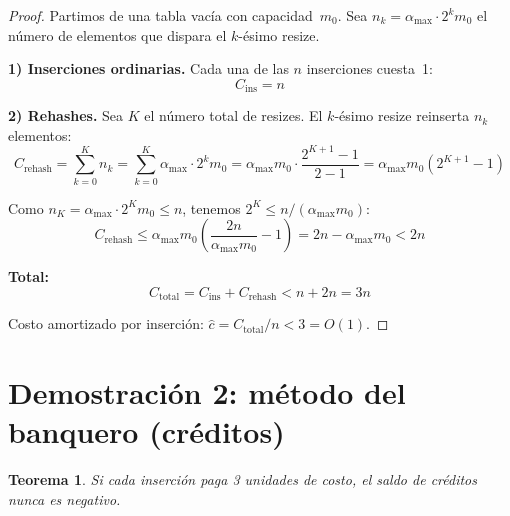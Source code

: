 \documentclass[11pt, letterpaper]{article}
\theoremstyle{definition}
\theoremstyle{plain}
\newtheorem{theorem}{Teorema}[section]
\theoremstyle{remark}
\begin{document}
\begin{proof}
Partimos de una tabla vacía con capacidad~$m_0$. Sea
$n_k = \alpha_{\max} \cdot 2^k m_0$ el número de elementos que
dispara el $k$-ésimo resize.

\textbf{1) Inserciones ordinarias.} Cada una de las $n$ inserciones
cuesta~1:
\[
  C_{\text{ins}} = n
\]

\textbf{2) Rehashes.} Sea $K$ el número total de resizes. El
$k$-ésimo resize reinserta $n_k$ elementos:
\[
  C_{\text{rehash}}
  = \sum_{k=0}^{K} n_k
  = \sum_{k=0}^{K} \alpha_{\max} \cdot 2^k m_0
  = \alpha_{\max} m_0 \cdot \frac{2^{K+1} - 1}{2 - 1}
  = \alpha_{\max} m_0 (2^{K+1} - 1)
\]

Como $n_K = \alpha_{\max} \cdot 2^K m_0 \leq n$, tenemos
$2^K \leq n/(\alpha_{\max} m_0)$:
\[
  C_{\text{rehash}}
  \leq \alpha_{\max} m_0
    \left(\frac{2n}{\alpha_{\max} m_0} - 1\right)
  = 2n - \alpha_{\max} m_0 < 2n
\]

\textbf{Total:}
\[
  C_{\text{total}} = C_{\text{ins}} + C_{\text{rehash}}
  < n + 2n = 3n
\]

Costo amortizado por inserción:
$\hat{c} = C_{\text{total}}/n < 3 = O(1)$.
\end{proof}

\section{Demostración 2: método del banquero (créditos)}

\begin{theorem}\label{thm:banker}
Si cada inserción paga 3 unidades de costo, el saldo de créditos
nunca es negativo.
\end{theorem}
\end{document}
